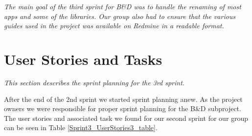 \textit{The main goal of the third sprint for B\&D was to handle the renaming of most apps and some of the libraries. Our group also had to ensure that the various guides used in the project was available on Redmine in a readable format.}

\section{User Stories and Tasks} \label{Sprint3_SecUserStoriesAndTasks}
\textit{This section describes the sprint planning for the 3rd sprint.}

After the end of the 2nd sprint we started sprint planning anew. As the project owners we were responsible for proper sprint planning for the B\&D subproject. The user stories and associated task we found for our second sprint for our group can be seen in Table \ref{Sprint3_UserStories3_table}.

